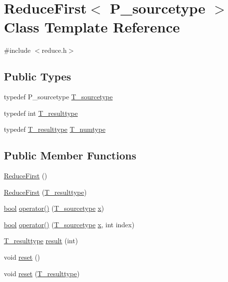 \hypertarget{classReduceFirst}{}\section{Reduce\+First$<$ P\+\_\+sourcetype $>$ Class Template Reference}
\label{classReduceFirst}


{\ttfamily \#include $<$reduce.\+h$>$}

\subsection*{Public Types}
\begin{DoxyCompactItemize}
\item 
typedef P\+\_\+sourcetype \hyperlink{classReduceFirst_ad153fdeca330b044f1fd20d47a541356}{T\+\_\+sourcetype}
\item 
typedef int \hyperlink{classReduceFirst_a011cd3328393e76bf26501a6b8652d09}{T\+\_\+resulttype}
\item 
typedef \hyperlink{classReduceFirst_a011cd3328393e76bf26501a6b8652d09}{T\+\_\+resulttype} \hyperlink{classReduceFirst_a2ad67486354b89d10192c554f28801eb}{T\+\_\+numtype}
\end{DoxyCompactItemize}
\subsection*{Public Member Functions}
\begin{DoxyCompactItemize}
\item 
\hyperlink{classReduceFirst_ae815b668f25b980ff33f958f9fe9625d}{Reduce\+First} ()
\item 
\hyperlink{classReduceFirst_acfc00c134b31e2ef811e80138b541a8d}{Reduce\+First} (\hyperlink{classReduceFirst_a011cd3328393e76bf26501a6b8652d09}{T\+\_\+resulttype})
\item 
\hyperlink{compiler_8h_abb452686968e48b67397da5f97445f5b}{bool} \hyperlink{classReduceFirst_a517365f803d905e9ae60394af846391f}{operator()} (\hyperlink{classReduceFirst_ad153fdeca330b044f1fd20d47a541356}{T\+\_\+sourcetype} \hyperlink{vecnorm1_8cc_ac73eed9e41ec09d58f112f06c2d6cb63}{x})
\item 
\hyperlink{compiler_8h_abb452686968e48b67397da5f97445f5b}{bool} \hyperlink{classReduceFirst_ac31004699f1c2f3e9845cb75e7e4bf84}{operator()} (\hyperlink{classReduceFirst_ad153fdeca330b044f1fd20d47a541356}{T\+\_\+sourcetype} \hyperlink{vecnorm1_8cc_ac73eed9e41ec09d58f112f06c2d6cb63}{x}, int index)
\item 
\hyperlink{classReduceFirst_a011cd3328393e76bf26501a6b8652d09}{T\+\_\+resulttype} \hyperlink{classReduceFirst_a5f412c378f543c484c868e41e7d6f88e}{result} (int)
\item 
void \hyperlink{classReduceFirst_a55066fea513c8fcac0aab4ef0bc87cb2}{reset} ()
\item 
void \hyperlink{classReduceFirst_ac2feb58022addced45363b7696701681}{reset} (\hyperlink{classReduceFirst_a011cd3328393e76bf26501a6b8652d09}{T\+\_\+resulttype})
\end{DoxyCompactItemize}
